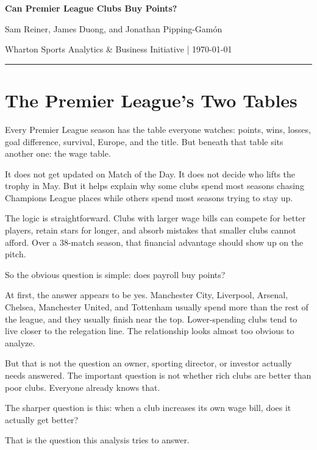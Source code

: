 \documentclass[12pt]{article}
\begin{document}
\begin{center}
    {\Huge\bfseries Can Premier League Clubs Buy Points?}\par
    \vspace{0.35em}
    {\large Sam Reiner, James Duong, and Jonathan Pipping-Gam\'on}\par
    {\small Wharton Sports Analytics \& Business Initiative \; | \; \today}\par
\end{center}

\vspace{0.5em}
\hrule
\vspace{1.0em}

\section{The Premier League's Two Tables}

Every Premier League season has the table everyone watches: points, wins, losses, goal difference, survival, Europe, and the title. But beneath that table sits another one: the wage table.

It does not get updated on Match of the Day. It does not decide who lifts the trophy in May. But it helps explain why some clubs spend most seasons chasing Champions League places while others spend most seasons trying to stay up.

The logic is straightforward. Clubs with larger wage bills can compete for better players, retain stars for longer, and absorb mistakes that smaller clubs cannot afford. Over a 38-match season, that financial advantage should show up on the pitch.

So the obvious question is simple: does payroll buy points?

At first, the answer appears to be yes. Manchester City, Liverpool, Arsenal, Chelsea, Manchester United, and Tottenham usually spend more than the rest of the league, and they usually finish near the top. Lower-spending clubs tend to live closer to the relegation line. The relationship looks almost too obvious to analyze.

But that is not the question an owner, sporting director, or investor actually needs answered. The important question is not whether rich clubs are better than poor clubs. Everyone already knows that.

The sharper question is this: when a club increases its own wage bill, does it actually get better?

That is the question this analysis tries to answer.
\end{document}

